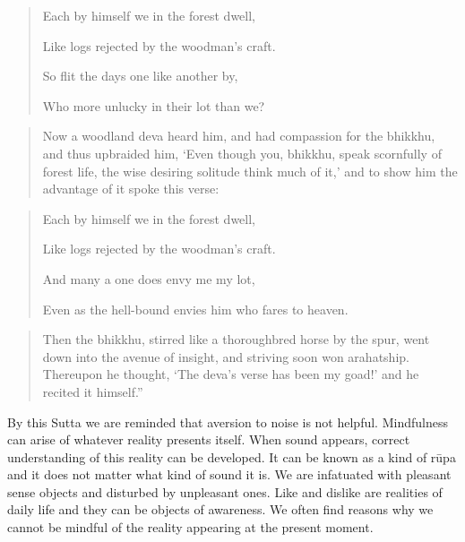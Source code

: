 \documentclass{book}
\begin{document}
\begin{verse}
Each by himself we in the forest dwell,

Like logs rejected by the woodman's craft.

So flit the days one like another by,

Who more unlucky in their lot than we?
\end{verse}




\begin{quote}\begin{flushleft} Now a woodland deva heard him, and had compassion for the bhikkhu, and
thus upbraided him, `Even though you, bhikkhu, speak scornfully of
forest life, the wise desiring solitude think much of it,' and to show
him the advantage of it spoke this verse:
\end{flushleft}\end{quote}




\begin{verse}
Each by himself we in the forest dwell,

Like logs rejected by the woodman's craft.

And many a one does envy me my lot,

Even as the hell-bound envies him who fares to heaven.

\end{verse}



\begin{quote}\begin{flushleft}
Then the bhikkhu, stirred like a thoroughbred horse by the spur, went
down into the avenue of insight, and striving soon won arahatship.
Thereupon he thought, `The deva's verse has been my goad!' and he
recited it himself.''
\end{flushleft}\end{quote}




By this Sutta we are reminded that aversion to noise is not helpful.
Mindfulness can arise of whatever reality presents itself. When sound
appears, correct understanding of this reality can be developed. It can
be known as a kind of r\=upa and it does not matter what kind of sound
it is. We are infatuated with pleasant sense objects and disturbed by
unpleasant ones. Like and dislike are realities of daily life and they
can be objects of awareness. We often find reasons why we cannot be
mindful of the reality appearing at the present moment.
\end{document}
